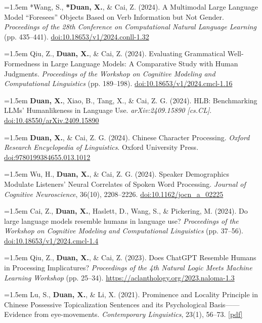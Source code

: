 \documentclass[11pt,a4paper]{article}
\begin{document}
\hangindent=1.5em  *Wang, S., \textbf{*Duan, X.}, \& Cai, Z. (2024). A Multimodal Large Language Model “Foresees” Objects Based on Verb Information but Not Gender. \textit{Proceedings of the 28th Conference on Computational Natural Language Learning} (pp. 435–441). \href{https://doi.org/10.18653/v1/2024.conll-1.32}{doi:10.18653/v1/2024.conll-1.32}

\hangindent=1.5em  Qiu, Z., \textbf{Duan, X.}, \& Cai, Z. (2024). Evaluating Grammatical Well-Formedness in Large Language Models: A Comparative Study with Human Judgments. \textit{Proceedings of the Workshop on Cognitive Modeling and Computational Linguistics} (pp. 189–198). \href{https://doi.org/10.18653/v1/2024.cmcl-1.16}{doi:10.18653/v1/2024.cmcl-1.16}

\hangindent=1.5em  \textbf{Duan, X.}, Xiao, B., Tang, X., \& Cai, Z. G. (2024). HLB: Benchmarking LLMs' Humanlikeness in Language Use. \textit{arXiv:2409.15890 [cs.CL]}. \href{https://doi.org/10.48550/arXiv.2409.15890}{doi:10.48550/arXiv.2409.15890}

\hangindent=1.5em  \textbf{Duan, X.}, \& Cai, Z. G. (2024). Chinese Character Processing. \textit{Oxford Research Encyclopedia of Linguistics}. Oxford University Press. \href{https://doi.org/10.1093/acrefore/9780199384655.013.1012}{doi:9780199384655.013.1012}

\hangindent=1.5em  Wu, H., \textbf{Duan, X.}, \& Cai, Z. G. (2024). Speaker Demographics Modulate Listeners' Neural Correlates of Spoken Word Processing. \textit{Journal of Cognitive Neuroscience}, 36(10), 2208–2226. \href{https://doi.org/10.1162/jocn_a_02225}{doi:10.1162/jocn_a_02225}

\hangindent=1.5em  Cai, Z., \textbf{Duan, X.}, Haslett, D., Wang, S., \& Pickering, M. (2024). Do large language models resemble humans in language use? \textit{Proceedings of the Workshop on Cognitive Modeling and Computational Linguistics} (pp. 37–56). \href{https://doi.org/10.18653/v1/2024.cmcl-1.4}{doi:10.18653/v1/2024.cmcl-1.4}

\hangindent=1.5em  Qiu, Z., \textbf{Duan, X.}, \& Cai, Z. (2023). Does ChatGPT Resemble Humans in Processing Implicatures? \textit{Proceedings of the 4th Natural Logic Meets Machine Learning Workshop} (pp. 25–34). \href{https://aclanthology.org/2023.naloma-1.3}{https://aclanthology.org/2023.naloma-1.3}

\hangindent=1.5em  Lu, S., \textbf{Duan, X.}, \& Li, X. (2021). Prominence and Locality Principle in Chinese Possessive Topicalization Sentences and its Psychological Basis——Evidence from eye-movements. \textit{Contemporary Linguistics}, 23(1), 56–73. \href{https://www.dropbox.com/scl/fi/4ga7a5ssslaed72hx3i2v/Prominence-and-Locality-Principle-in-Chinese-Possessive-Topicalization-Sentences.pdf?rlkey=7rtvpqolr2xs6rtlychdtatwb&st=672mpgkb&dl=0}{[pdf]}
\end{document}
